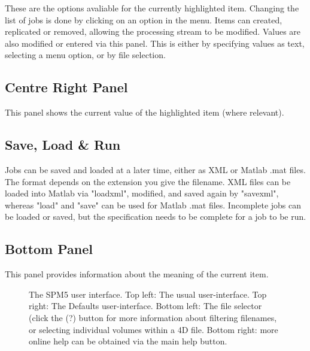 \documentclass[a4paper,titlepage]{book}
\begin{document}
These are the options avaliable for the currently highlighted item. Changing the list of jobs is done by clicking on an option in the menu. Items can created, replicated or removed, allowing the processing stream to be modified. Values are also modified or entered via this panel. This is either by specifying values as text, selecting a menu option, or by file selection.




\subsection*{Centre Right Panel}

This panel shows the current value of the highlighted item (where relevant).




\subsection*{Save, Load \& Run}

Jobs can be saved and loaded at a later time, either as XML or Matlab .mat files.  The format depends on the extension you give the filename. XML files can be loaded into Matlab via "loadxml", modified, and saved again by "savexml", whereas "load" and "save" can be used for Matlab .mat files. Incomplete jobs can be loaded or saved, but the specification needs to be complete for a job to be run.




\subsection*{Bottom Panel}

This panel provides information about the meaning of the current item.

\begin{figure} \begin{center}    \end{center} \caption{The SPM5 user interface. Top left: The usual user-interface.  Top right: The Defaults user-interface. Bottom left: The file selector (click the (?) button for more information about filtering filenames, or selecting individual volumes within a 4D file. Bottom right: more online help can be obtained via the main help button.} \end{figure} 
\end{document}
